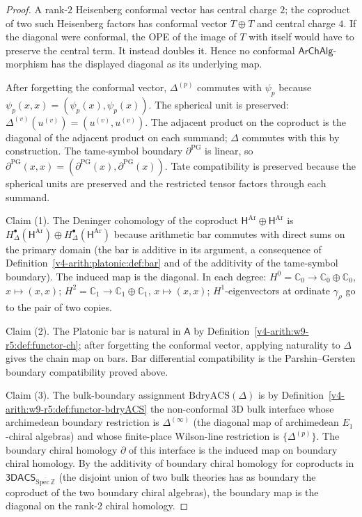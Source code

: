 \begin{proof}
A rank-\(2\) Heisenberg conformal vector has central charge \(2\);
the coproduct of two such Heisenberg factors has conformal vector
\(T\oplus T\) and central charge \(4\). If the diagonal were conformal,
the OPE of the image of \(T\) with itself would have to preserve the
central term. It instead doubles it. Hence no conformal
\(\mathsf{ArChAlg}\)-morphism has the displayed diagonal as its
underlying map.

After forgetting the conformal vector, \(\Delta^{(p)}\) commutes with
\(\psi_{p}\) because \(\psi_{p}(x,x)=(\psi_{p}(x),\psi_{p}(x))\).
The spherical unit is preserved:
\(\Delta^{(v)}(u^{(v)})=(u^{(v)},u^{(v)})\). The adjacent product
on the coproduct is the diagonal of the adjacent product on each
summand; \(\Delta\) commutes with this by construction. The
tame-symbol boundary \(\partial^{\mathrm{PG}}\) is linear, so
\(\partial^{\mathrm{PG}}(x,x)=(\partial^{\mathrm{PG}}(x),\partial^{\mathrm{PG}}(x))\).
Tate compatibility is preserved because the spherical units are
preserved and the restricted tensor factors through each summand.

Claim (1). The Deninger cohomology of the coproduct
\(\mathsf{H}^{\mathrm{Ar}}\oplus\mathsf{H}^{\mathrm{Ar}}\) is
\(H^{\bullet}_{\Delta}(\mathsf{H}^{\mathrm{Ar}})\oplus H^{\bullet}_{\Delta}(\mathsf{H}^{\mathrm{Ar}})\)
because arithmetic bar commutes with direct sums on the primary
domain (the bar is additive in its argument, a consequence of
Definition~\ref{v4-arith:platonic:def:bar} and of the additivity of the
tame-symbol boundary). The induced map is the diagonal. In each
degree:
\(H^{0}=\mathbb{C}_{0}\to\mathbb{C}_{0}\oplus\mathbb{C}_{0}\),
\(x\mapsto(x,x)\); \(H^{2}=\mathbb{C}_{1}\to\mathbb{C}_{1}\oplus\mathbb{C}_{1}\),
\(x\mapsto(x,x)\); \(H^{1}\)-eigenvectors at ordinate \(\gamma_{\rho}\)
go to the pair of two copies.

Claim (2). The Platonic bar is natural in \(\mathsf{A}\) by
Definition~\ref{v4-arith:w9-r5:def:functor-ch}; after forgetting the conformal
vector, applying naturality to \(\Delta\) gives the chain map on bars.
Bar differential compatibility is the Parshin--Gersten boundary
compatibility proved above.

Claim (3). The bulk-boundary assignment
\(\mathrm{BdryACS}(\Delta)\) is by
Definition~\ref{v4-arith:w9-r5:def:functor-bdryACS} the non-conformal 3D bulk interface
whose archimedean boundary restriction is \(\Delta^{(\infty)}\) (the
diagonal map of archimedean \(E_{1}\)-chiral algebras) and whose
finite-place Wilson-line restriction is
\(\{\Delta^{(p)}\}\). The boundary chiral homology \(\partial\) of this
interface is the induced map on boundary chiral homology. By
the additivity of boundary chiral homology for coproducts in
\(\mathsf{3DACS}_{\overline{\mathrm{Spec}\,\mathbb{Z}}}\) (the disjoint
union of two bulk theories has as boundary the coproduct of
the two boundary chiral algebras), the boundary map is the diagonal
on the rank-\(2\) chiral homology.


\end{proof}
